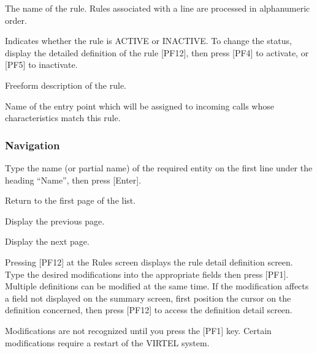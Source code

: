 \documentclass[letterpaper,10pt,english]{sphinxmanual}
\begin{document}
\sphinxAtStartPar
{}
\begin{description}
\sphinxAtStartPar
The name of the rule. Rules associated with a line are processed in alphanumeric order.

\sphinxAtStartPar
Indicates whether the rule is ACTIVE or INACTIVE. To change the status, display the detailed definition of the rule {[}PF12{]}, then press {[}PF4{]} to activate, or {[}PF5{]} to inactivate.

\sphinxAtStartPar
Free\sphinxhyphen{}form description of the rule.

\sphinxAtStartPar
Name of the entry point which will be assigned to incoming calls whose characteristics match this rule.

\end{description}


\subsubsection{Navigation}
\label{\detokenize{connectivity_guide:id45}}\begin{description}
\sphinxAtStartPar
Type the name (or partial name) of the required entity on the first line under the heading “Name”, then press {[}Enter{]}.

\sphinxlineitem{{[}PF6{]}}
\sphinxAtStartPar
Return to the first page of the list.

\sphinxlineitem{{[}PF7{]}}
\sphinxAtStartPar
Display the previous page.

\sphinxlineitem{{[}PF8{]}}
\sphinxAtStartPar
Display the next page.

\end{description}

\sphinxAtStartPar
{} \sphinxhyphen{} Pressing {[}PF12{]} at the Rules screen displays the rule detail definition screen. Type the desired modifications into the appropriate fields then press {[}PF1{]}. Multiple definitions can be modified at the same time. If the modification affects a field not displayed on the summary screen, first position the cursor on the definition concerned, then press {[}PF12{]} to access the definition detail screen.
\begin{description}
\sphinxAtStartPar
Modifications are not recognized until you press the {[}PF1{]} key. Certain modifications require a restart of the VIRTEL system.

\end{description}
\end{document}
